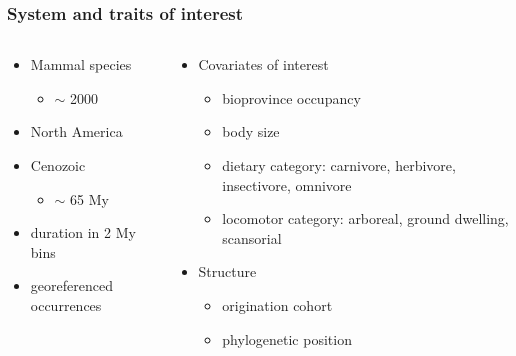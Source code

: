 \documentclass{beamer}
\begin{document}
\begin{frame}
  \frametitle{System and traits of interest}

  \begin{columns}
    \begin{column}{0.5\textwidth}
      \begin{itemize}
        \item Mammal species
          \begin{itemize}
            \item \(\sim\) 2000
          \end{itemize}
        \item North America
        \item Cenozoic
          \begin{itemize}
            \item \(\sim\) 65 My
          \end{itemize}
        \item duration in 2 My bins
        \item georeferenced occurrences
      \end{itemize}
    \end{column}
    \begin{column}{0.5\textwidth}
      \begin{itemize}
        \item Covariates of interest
          \begin{itemize}
            \item bioprovince occupancy
            \item body size
            \item dietary category: carnivore, herbivore, insectivore, omnivore
            \item locomotor category: arboreal, ground dwelling, scansorial
          \end{itemize}
        \item Structure
          \begin{itemize}
            \item origination cohort
            \item phylogenetic position
          \end{itemize}
      \end{itemize}
    \end{column}
  \end{columns}
\end{frame}

\end{document}
